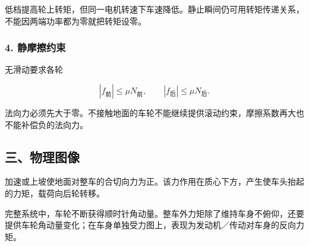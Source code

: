 \documentclass[12pt,a4paper,fontset=fandol]{ctexart}
\begin{document}
低档提高轮上转矩，但同一电机转速下车速降低。静止瞬间仍可用转矩传递关系，不能因两端功率都为零就把转矩设零。

\subsubsection{4. 静摩擦约束}\label{ux9759ux6469ux64e6ux7ea6ux675f}

无滑动要求各轮

\[
|f_{\text{前}}|\leq\mu N_{\text{前}},\qquad
|f_{\text{后}}|\leq\mu N_{\text{后}}.
\]

法向力必须先大于零。不接触地面的车轮不能继续提供滚动约束，摩擦系数再大也不能补偿负的法向力。

\subsection{三、物理图像}\label{ux4e09ux7269ux7406ux56feux50cf-6}

加速或上坡使地面对整车的合切向力为正。该力作用在质心下方，产生使车头抬起的力矩，载荷向后轮转移。

完整系统中，车轮不断获得顺时针角动量。整车外力矩除了维持车身不俯仰，还要提供车轮角动量变化；在车身单独受力图上，表现为发动机／传动对车身的反向力矩。

\begin{center}
\begin{minipage}{\linewidth}
\centering\begingroup{}
\ifdim\wd\diagrambox>.88\linewidth
\sbox{\diagrambox}{\resizebox{.88\linewidth}{!}{\usebox{\diagrambox}}}\fi
\ifdim\ht\diagrambox>.38\textheight
\resizebox{!}{.38\textheight}{\usebox{\diagrambox}}
\else\usebox{\diagrambox}\fi
\par{}\endgroup\end{minipage}\end{center}
\end{document}
